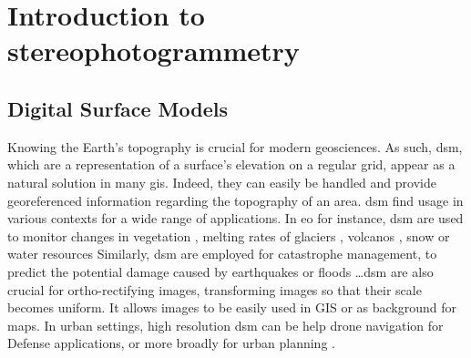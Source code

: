 
\chapter{Introduction to stereophotogrammetry}




\section{Digital Surface Models}
Knowing the Earth's topography is crucial for modern geosciences. As such, \acrfull{dsm}, which are a representation of a surface's elevation on a regular grid, appear as a natural solution in many \acrfull{gis}. Indeed, they can easily be handled and provide georeferenced information regarding the topography of an area. \acrshort{dsm} find usage in various contexts for a wide range of applications. In \acrfull{eo} for instance, \acrshort{dsm} are used to monitor changes in vegetation \cite{sadeghi_canopy_2016}, melting rates of glaciers \cite{berthier_glacier_2014, rieg_pleiades_2018}, volcanos \cite{ganci_data_2022}, snow or water resources \cite{marti_mapping_2016, yamazaki_merit_2019} \etc Similarly, \acrshort{dsm} are employed for catastrophe management, to predict the potential damage caused by earthquakes or floods \cite{jenkins_physics-based_2023} \dots \acrshort{dsm} are also crucial for ortho-rectifying images, \ie transforming images so that their scale becomes uniform. It allows images to be easily used in GIS or as background for maps. In urban settings, high resolution \acrshort{dsm} can be help drone navigation for Defense applications, or more broadly for urban planning \cite{velazco_3d_2012}.

